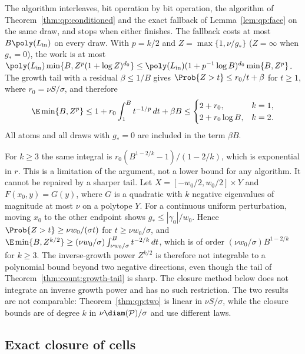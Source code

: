 The algorithm interleaves, bit operation by bit operation, the algorithm of
Theorem~\ref{thm:qp:conditioned} and the exact fallback of
Lemma~\ref{lem:qp:face} on the same draw, and stops when either finishes. The
fallback costs at most $B\poly(L_{\rm in})$ on every draw. With
$p=k/2$ and $Z=\max\{1,\nu/g_*\}$ ($Z=\infty$ when $g_*=0$), the work is at
most $\poly(L_{\rm in})\min\{B,Z^p(1+\log Z)^{d_0}\}\le
\poly(L_{\rm in})(1+p^{-1}\log B)^{d_0}\min\{B,Z^p\}$. The growth tail with a
residual $\beta\le1/B$ gives $\Prob\{Z>t\}\le r_0/t+\beta$ for $t\ge1$, where
$r_0=\nu S/\sigma$, and therefore
\[
 \E\min\{B,Z^p\}\le1+r_0\int_1^Bt^{-1/p}\,dt+\beta B
 \le\begin{cases}2+r_0,&k=1,\\ 2+r_0\log B,&k=2.\end{cases}
\]
All atoms and all draws with $g_*=0$ are included in the term $\beta B$.

\begin{remark}\label{rem:qp:moments}
For $k\ge3$ the same integral is
$r_0(B^{1-2/k}-1)/(1-2/k)$, which is exponential in $r$. This is a limitation
of the argument, not a lower bound for any algorithm. It cannot be repaired by
a sharper tail. Let $X=[-w_0/2,w_0/2]\times Y$ and $F(x_0,y)=G(y)$, where $G$
is a quadratic with $k$ negative eigenvalues of magnitude at most $\nu$ on a
polytope $Y$. For a continuous uniform perturbation, moving $x_0$ to the other
endpoint shows $g_*\le|\gamma_0|/w_0$. Hence
$\Prob\{Z>t\}\ge\nu w_0/(\sigma t)$ for $t\ge\nu w_0/\sigma$, and
$\E\min\{B,Z^{k/2}\}\ge(\nu w_0/\sigma)\int_{\nu w_0/\sigma}^Bt^{-2/k}\,dt$,
which is of order $(\nu w_0/\sigma)B^{1-2/k}$ for $k\ge3$. The inverse-growth
power $Z^{k/2}$ is therefore not integrable to a polynomial bound beyond two
negative directions, even though the tail of
Theorem~\ref{thm:count:growth-tail} is sharp. The closure method below does
not integrate an inverse growth power and has no such restriction. The two
results are not comparable: Theorem~\ref{thm:qp:two} is linear in
$\nu S/\sigma$, while the closure bounds are of degree $k$ in
$\nu\diam(\mathcal P)/\sigma$ and use different laws.
\end{remark}

\subsection{Exact closure of cells}\label{sec:qp:closure}

